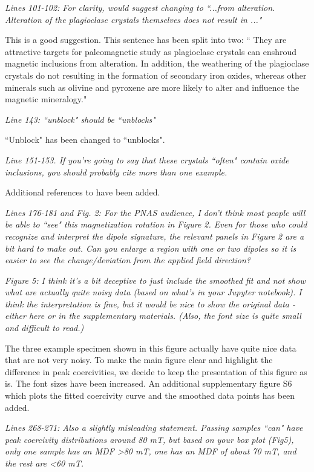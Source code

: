 \documentclass[11pt, letterpaper]{article}
\begin{document}
\begin{flushleft}
\textit{Lines 101-102: For clarity, would suggest changing to ``...from alteration. Alteration of the plagioclase crystals themselves does not result in ..."}

This is a good suggestion. This sentence has been split into two: `` They are attractive targets for paleomagnetic study as plagioclase crystals can enshroud magnetic inclusions from alteration. In addition, the weathering of the plagioclase crystals do not resulting in the formation of secondary iron oxides, whereas other minerals such as olivine and pyroxene are more likely to alter and influence the magnetic mineralogy."

\textit{Line 143: ``unblock" should be ``unblocks"}

``Unblock" has been changed to ``unblocks".

\textit{Line 151-153. If you're going to say that these crystals ``often" contain oxide inclusions, you should probably cite more than one example.}

Additional references to \cite{Wenk2011a, Ageeva2016a} have been added. 

\textit{Lines 176-181 and Fig. 2: For the PNAS audience, I don't think most people will be able to ``see" this magnetization rotation in Figure 2. Even for those who could recognize and interpret the dipole signature, the relevant panels in Figure 2 are a bit hard to make out. Can you enlarge a region with one or two dipoles so it is easier to see the change/deviation from the applied field direction?}



\textit{Figure 5: I think it's a bit deceptive to just include the smoothed fit and not show what are actually quite noisy data (based on what's in your Jupyter notebook). I think the interpretation is fine, but it would be nice to show the original data - either here or in the supplementary materials. (Also, the font size is quite small and difficult to read.)}

The three example specimen shown in this figure actually have quite nice data that are not very noisy. To make the main figure clear and highlight the difference in peak coercivities, we decide to keep the presentation of this figure as is. The font sizes have been increased. An additional supplementary figure S6 which plots the fitted coercivity curve and the smoothed data points has been added. 

\textit{Lines 268-271: Also a slightly misleading statement. Passing samples ``can" have peak coercivity distributions around 80 mT, but based on your box plot (Fig5), only one sample has an MDF >80 mT, one has an MDF of about 70 mT, and the rest are <60 mT.}


\end{flushleft}
\end{document}
